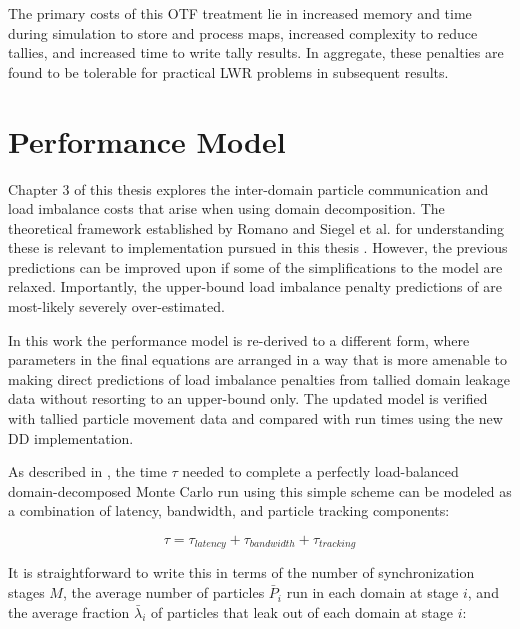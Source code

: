 \documentclass[12pt,twoside]{mitthesis-exec}
\begin{document}
The primary costs of this OTF treatment lie in increased memory and time
during simulation to store and process maps, increased complexity to reduce
tallies, and increased time to write tally results. In aggregate, these
penalties are found to be tolerable for practical LWR problems in subsequent
results.

\section*{Performance Model}

Chapter 3 of this thesis explores the inter-domain particle communication and
load imbalance costs that arise when using domain decomposition. The theoretical
framework established by Romano and Siegel et al. for understanding these is
relevant to implementation pursued in this thesis \cite{Siegel1,
Siegel2, romano_thesis}. However, the previous predictions can be improved upon if some of the
simplifications to the model are relaxed. Importantly, the upper-bound load
imbalance penalty predictions of \cite{Siegel2} are most-likely severely
over-estimated.

In this work the performance model is re-derived to a different form, where
parameters in the final equations are arranged in a way that is more amenable to
making direct predictions of load imbalance penalties from tallied domain
leakage data without resorting to an upper-bound only. The updated model is
verified with tallied particle movement data and compared with run times using
the new DD implementation.

As described in \cite{Siegel2}, the time $\tau$ needed to complete a perfectly
load-balanced domain-decomposed Monte Carlo run using this simple scheme can be
modeled as a combination of latency, bandwidth, and particle tracking
components:

\begin{equation}
    \tau = \tau_{latency} + \tau_{bandwidth} + \tau_{tracking}
    \label{eqn:baltime_high-level}
\end{equation}

It is straightforward to write this in terms of the number of synchronization
stages $M$, the average number of particles $\bar P_i$ run in each domain at
stage $i$, and the average fraction $\bar \lambda_i$ of particles that leak out
of each domain at stage $i$:
\end{document}
